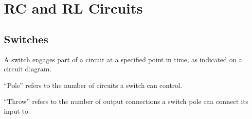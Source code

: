 \documentclass{article}
\begin{document}
\section{RC and RL Circuits}
\subsection{Switches}
\begin{definition}
    A switch engages part of a circuit at a specified point in time, as
    indicated on a circuit diagram.
\end{definition}
\begin{definition}[Poles]
    ``Pole'' refers to the number of circuits a switch can control.
\end{definition}
\begin{definition}[Throw]
    ``Throw'' refers to the number of output connections a switch pole
    can connect its input to.
\end{definition}
\end{document}
